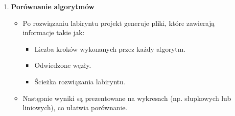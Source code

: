 \documentclass{article}
\begin{document}
\begin{enumerate}
    \item \textbf{Porównanie algorytmów}
    \begin{itemize}
        \item Po rozwiązaniu labiryntu projekt generuje pliki, które zawierają informacje takie jak:
        \begin{itemize}
            \item Liczba kroków wykonanych przez każdy algorytm.
            \item Odwiedzone węzły.
            \item Ścieżka rozwiązania labiryntu.
        \end{itemize}
        \item Następnie wyniki są prezentowane na wykresach (np. słupkowych lub liniowych), co ułatwia porównanie.
    \end{itemize}
\end{enumerate}
\end{document}
